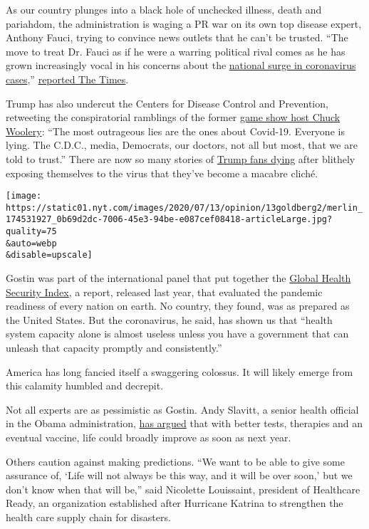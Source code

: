 As our country plunges into a black hole of unchecked illness, death and
pariahdom, the administration is waging a PR war on its own top disease
expert, Anthony Fauci, trying to convince news outlets that he can't be
trusted. ``The move to treat Dr. Fauci as if he were a warring political
rival comes as he has grown increasingly vocal in his concerns about the
\href{https://www.nytimes.com/interactive/2020/us/coronavirus-us-cases.html}{national
surge in coronavirus cases},''
\href{https://www.nytimes.com/2020/07/12/world/coronavirus-updates.html\#_blank}{reported
The Times}.

Trump has also undercut the Centers for Disease Control and Prevention,
retweeting the conspiratorial ramblings of the former
\href{https://twitter.com/chuckwoolery/status/1282499347117215745?s=20}{game
show host Chuck Woolery}: ``The most outrageous lies are the ones about
Covid-19. Everyone is lying. The C.D.C., media, Democrats, our doctors,
not all but most, that we are told to trust.'' There are now so many
stories of
\href{https://www.dailymail.co.uk/news/article-8515535/Ohio-man-37-dies-coronavirus-claiming-pandemic-just-hype-Facebook-post.html}{Trump
fans dying} after blithely exposing themselves to the virus that they've
become a macabre cliché.

\texttt{[image: https://static01.nyt.com/images/2020/07/13/opinion/13goldberg2/merlin\_174531927\_0b69d2dc-7006-45e3-94be-e087cef08418-articleLarge.jpg?quality=75\\\&auto=webp\\\&disable=upscale]}

Gostin was part of the international panel that put together the
\href{https://www.ghsindex.org/}{Global Health Security Index}, a
report, released last year, that evaluated the pandemic readiness of
every nation on earth. No country, they found, was as prepared as the
United States. But the coronavirus, he said, has shown us that ``health
system capacity alone is almost useless unless you have a government
that can unleash that capacity promptly and consistently.''

America has long fancied itself a swaggering colossus. It will likely
emerge from this calamity humbled and decrepit.

Not all experts are as pessimistic as Gostin. Andy Slavitt, a senior
health official in the Obama administration,
\href{https://twitter.com/ASlavitt/status/1282465694664273922?s=20}{has
argued} that with better tests, therapies and an eventual vaccine, life
could broadly improve as soon as next year.

Others caution against making predictions. ``We want to be able to give
some assurance of, `Life will not always be this way, and it will be
over soon,' but we don't know when that will be,'' said Nicolette
Louissaint, president of Healthcare Ready, an organization established
after Hurricane Katrina to strengthen the health care supply chain for
disasters.

